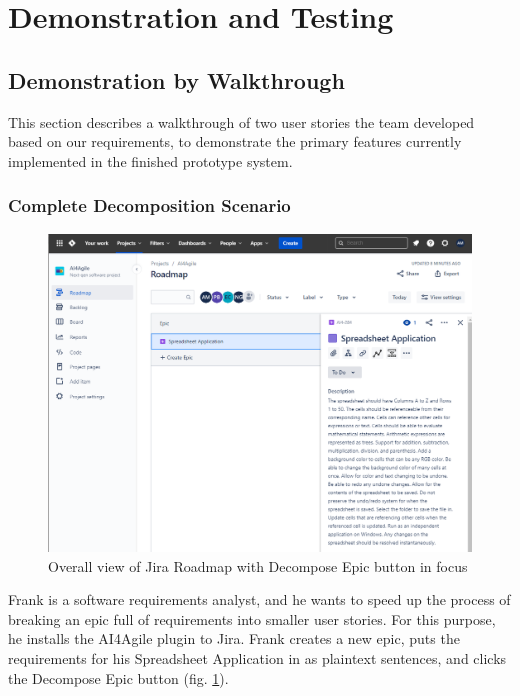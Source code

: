 \section{Demonstration and Testing}
\label{demo}

\subsection{Demonstration by Walkthrough}

This section describes a walkthrough of two user stories the team developed based on our requirements, to demonstrate the primary features currently implemented in the finished prototype system. 

\subsubsection{Complete Decomposition Scenario}
\label{Scenario1}

\begin{figure}
\centerline{\includegraphics[width=\textwidth,height=\textheight,keepaspectratio]{./figure/Scenario1Figure1.png}}
\caption{Overall view of Jira Roadmap with Decompose Epic button in focus}
\label{fig:Scenario1Figure1}
\end{figure}

Frank is a software requirements analyst, and he wants to speed up the process of breaking an epic full of requirements into smaller user stories. For this purpose, he installs the AI4Agile plugin to Jira. Frank creates a new epic, puts the requirements for his Spreadsheet Application in as plaintext sentences, and clicks the Decompose Epic button (fig. \ref{fig:Scenario1Figure1}).

